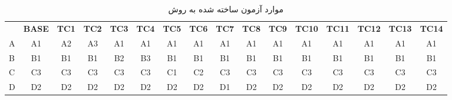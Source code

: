 \documentclass[twoside]{article}
\newenvironment{answer}{}{\medskip}
\begin{document}
\begin{answer}
	\begin{table}[h]
		\centering
		\caption{موارد آزمون ساخته شده به روش }
		\label{tbl:bcc-test-cases}
		\begin{latin}
		\begin{tabular}{lccccccccccccccc}
  & \multicolumn{1}{l}{\textbf{BASE}} & \multicolumn{1}{l}{\textbf{TC1}} & \multicolumn{1}{l}{\textbf{TC2}} & \multicolumn{1}{l}{\textbf{TC3}} & \multicolumn{1}{l}{\textbf{TC4}} & \multicolumn{1}{l}{\textbf{TC5}} & \multicolumn{1}{l}{\textbf{TC6}} & \multicolumn{1}{l}{\textbf{TC7}} & \multicolumn{1}{l}{\textbf{TC8}} & \multicolumn{1}{l}{\textbf{TC9}} & \multicolumn{1}{l}{\textbf{TC10}} & \multicolumn{1}{l}{\textbf{TC11}} & \multicolumn{1}{l}{\textbf{TC12}} & \multicolumn{1}{l}{\textbf{TC13}} & \multicolumn{1}{l}{\textbf{TC14}} \\
A & A1                                & A2                               & A3                               & A1                               & A1                               & A1                               & A1                               & A1                               & A1                               & A1                               & A1                                & A1                                & A1                                & A1                                & A1                                \\
B & B1                                & B1                               & B1                               & B2                               & B3                               & B1                               & B1                               & B1                               & B1                               & B1                               & B1                                & B1                                & B1                                & B1                                & B1                                \\
C & C3                                & C3                               & C3                               & C3                               & C3                               & C1                               & C2                               & C3                               & C3                               & C3                               & C3                                & C3                                & C3                                & C3                                & C3                                \\
D & D2                                & D2                               & D2                               & D2                               & D2                               & D2                               & D2                               & D1                               & D2                               & D2                               & D2                                & D2                                & D2                                & D2                                & D2                                \\

\end{tabular}
\end{latin}
\end{table}
\end{answer}
\end{document}
